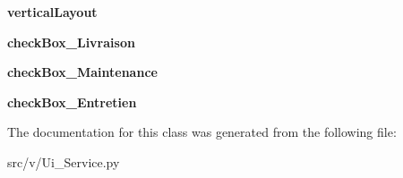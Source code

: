 \begin{DoxyCompactItemize}
\item 
\hypertarget{classsrc_1_1v_1_1_ui___service_1_1_ui___service_ace817343978b6f8ca9f5ca31a501e8b9}{}{\bfseries vertical\+Layout}\label{classsrc_1_1v_1_1_ui___service_1_1_ui___service_ace817343978b6f8ca9f5ca31a501e8b9}

\item 
\hypertarget{classsrc_1_1v_1_1_ui___service_1_1_ui___service_a55fa1da6f0a7c44dbe6274c773fe4da3}{}{\bfseries check\+Box\+\_\+\+Livraison}\label{classsrc_1_1v_1_1_ui___service_1_1_ui___service_a55fa1da6f0a7c44dbe6274c773fe4da3}

\item 
\hypertarget{classsrc_1_1v_1_1_ui___service_1_1_ui___service_a3846bb898f5a2932b9baf187518bcfb9}{}{\bfseries check\+Box\+\_\+\+Maintenance}\label{classsrc_1_1v_1_1_ui___service_1_1_ui___service_a3846bb898f5a2932b9baf187518bcfb9}

\item 
\hypertarget{classsrc_1_1v_1_1_ui___service_1_1_ui___service_aafb6e288564e2c4846effe5d22717778}{}{\bfseries check\+Box\+\_\+\+Entretien}\label{classsrc_1_1v_1_1_ui___service_1_1_ui___service_aafb6e288564e2c4846effe5d22717778}

\end{DoxyCompactItemize}


The documentation for this class was generated from the following file\+:\begin{DoxyCompactItemize}
\item 
src/v/Ui\+\_\+\+Service.\+py\end{DoxyCompactItemize}
